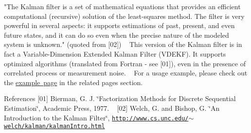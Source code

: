 "The Kalman filter is a set of mathematical equations that provides an efficient computational (recursive) solution of the least-\/squares method. The filter is very powerful in several aspects\+: it supports estimations of past, present, and even future states, and it can do so even when the precise nature of the modeled system is unknown." (quoted from \mbox{[}02\mbox{]}) ~\newline
This version of the Kalman filter is in fact a Variable-\/\+Dimension Extended Kalman Filter (V\+D\+E\+KF). It supports optimized algorithms (translated from Fortran -\/ see \mbox{[}01\mbox{]}), even in the presence of correlated process or measurement noise. ~\newline
For a usage example, please check out the \mbox{\hyperlink{Example_expage}{example page}} in the related pages section. \begin{DoxyParagraph}{References}
\mbox{[}01\mbox{]} Bierman, G. J. \char`\"{}\+Factorization Methods for Discrete Sequential
\+Estimation\char`\"{}, Academic Press, 1977. ~\newline
\mbox{[}02\mbox{]} Welch, G. and Bishop, G. \char`\"{}\+An Introduction to the Kalman Filter\char`\"{}, \href{http://www.cs.unc.edu/~welch/kalman/kalmanIntro.html}{\tt http\+://www.\+cs.\+unc.\+edu/$\sim$welch/kalman/kalman\+Intro.\+html} 
\end{DoxyParagraph}
